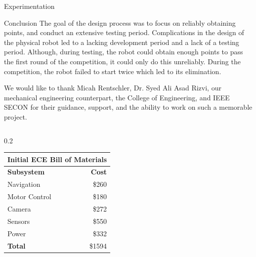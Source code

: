 \documentclass[final]{beamer}
\newlength{\colwidth}
\begin{document}
\begin{frame}[t]
\begin{columns}[t]
\begin{column}{\colwidth}
\begin{block}{Experimentation}
  \end{block}


  \begin{block}{Conclusion}
    The goal of the design process was to focus on reliably obtaining points, and conduct an extensive testing period. Complications in the design of the physical robot led to a lacking development period and a lack of a testing period. Although, during testing, the robot could obtain enough points to pass the first round of the competition, it could only do this unreliably. During the competition, the robot failed to start twice which led to its elimination.

    We would like to thank Micah Rentschler, Dr. Syed Ali Asad Rizvi, our mechanical engineering counterpart, the College of Engineering, and IEEE SECON for their guidance, support, and the ability to work on such a memorable project.


  \begin{columns}[t]
  
    \hspace{-2.5cm}
    \begin{column}{0.2\colwidth}
      \begin{table}[ht]
        \begin{center}
          \label{tab:InitialECEBillofMaterials}
          \begin{tabular}{l|r} %
            \toprule
            \multicolumn{2}{c}{\textbf{Initial ECE Bill of Materials}} \\
            \midrule
            \cellcolor{white}\textbf{Subsystem} & \cellcolor{white}\textbf{Cost} \\
            \midrule
            Navigation & \$260 \\
            Motor Control & \$180 \\
            Camera & \$272 \\
            Sensors & \$550 \\
            Power & \$332 \\
            \cellcolor{white}\textbf{Total} & \cellcolor{white}\$1594 \\
            \bottomrule
          \end{tabular}
        \end{center}
      \end{table}    
    \end{column}


\end{columns}
\end{block}
\end{column}
\end{columns}
\end{frame}
\end{document}
